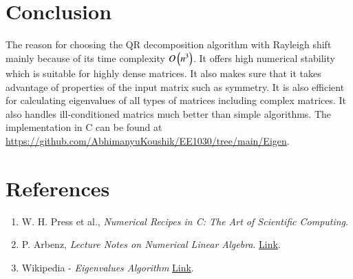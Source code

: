 \documentclass[a4paper,12pt]{article}
\theoremstyle{remark}
\begin{document}
\section{Conclusion}
The reason for choosing the QR decomposition algorithm with Rayleigh shift mainly because of its time complexity $O\left(n^3\right)$. It offers high numerical stability which is suitable for highly dense matrices. It also makes sure that it takes advantage of properties of the input matrix such as symmetry. It is also efficient for calculating eigenvalues of all types of matrices including complex matrices. It also handles ill-conditioned matrics much better than simple algorithms.
The implementation in C can be found at \href{https://github.com/AbhimanyuKoushik/EE1030/tree/main/Eigen}{https://github.com/AbhimanyuKoushik/EE1030/tree/main/Eigen}.
\section*{References}
\begin{enumerate}
    \item W. H. Press et al., \textit{Numerical Recipes in C: The Art of Scientific Computing}.
    \item P. Arbenz, \textit{Lecture Notes on Numerical Linear Algebra}. 
        \href{https://people.inf.ethz.ch/arbenz/ewp/Lnotes/chapter4.pdf}{Link}.
    \item Wikipedia - \textit{Eigenvalues Algorithm}
        \href{https://en.wikipedia.org/wiki/Eigenvalue_algorithm}{Link}.
\end{enumerate}
\end{document}
